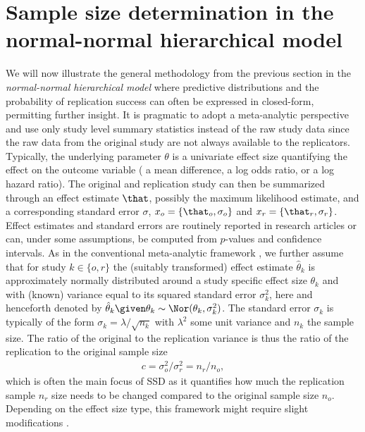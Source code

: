 \section{Sample size determination in the normal-normal hierarchical model}
\label{sec3:SS}
We will now illustrate the general methodology from the previous section in the
\emph{normal-normal hierarchical model} where predictive distributions and the
probability of replication success can often be expressed in closed-form,
permitting further insight. %
It is pragmatic to adopt a meta-analytic perspective and use only study level
summary statistics instead of the raw study data since the raw data from the
original study are not always available to the replicators. Typically, the
underlying parameter $\theta$ is a univariate effect size quantifying the effect
on the outcome variable (\eg{} a mean difference, a log odds ratio, or a log
hazard ratio). The original and replication study can then be summarized through
an effect estimate $\that$, possibly the maximum likelihood estimate, and a
corresponding standard error $\sigma$, \ie{} $x_{o} = \{\that_{o}, \sigma_{o}\}$
and $x_{r} = \{\that_{r}, \sigma_{r}\}$. Effect estimates and standard errors
are routinely reported in research articles or can, under some assumptions, be
computed from $p$-values and confidence intervals. As in the conventional
meta-analytic framework \citep{Sutton2001}, we further assume that for study
$k \in \{o, r\}$ the (suitably transformed) effect estimate $\hat{\theta}_k$ is
approximately normally distributed around a study specific effect size
$\theta_k$ and with (known) variance equal to its squared standard error
$\sigma_k^2$, here and henceforth denoted by
$\hat{\theta}_k \given \theta_k \sim \Nor(\theta_k, \sigma_k^2)$. The standard
error $\sigma_k$ is typically of the form $\sigma_k = \lambda/\sqrt{n_k}$ with
$\lambda^{2}$ some unit variance and $n_{k}$ the sample size. The ratio of the
original to the replication variance is thus the ratio of the replication to the
original sample size
\begin{align*}
  c = \sigma^2_o/\sigma^2_r = n_r/n_o,
\end{align*}
which is often the main focus of SSD as it quantifies how much the replication
sample $n_{r}$ size needs to be changed compared to the original sample size
$n_{o}$. Depending on the effect size type, this framework might require slight
modifications \citep[see \eg{}][ch. 2.4]{Spiegelhalter2004}.

